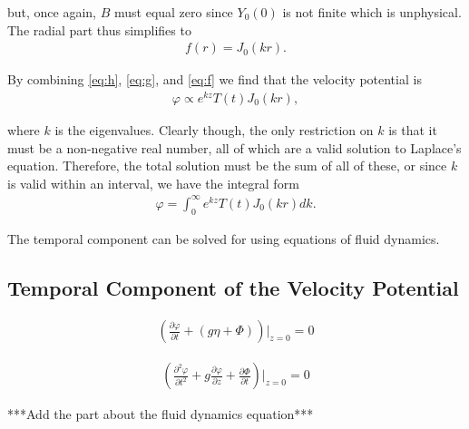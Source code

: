 \documentclass[12pt]{article}
\begin{document}
but, once again, $B$ must equal zero since $Y_0(0)$ is not finite which is unphysical. The radial part thus simplifies to
\begin{align}
\label{eq:f}
f(r) = J_0(kr).
\end{align}

By combining \eqref{eq:h}, \eqref{eq:g}, and \eqref{eq:f} we find that the velocity potential is 
\begin{align*}
\varphi \propto e^{kz}T(t)J_0(kr),
\end{align*}

where $k$ is the eigenvalues. Clearly though, the only restriction on $k$ is that it must be a non-negative real number, all of which are a valid solution to Laplace's equation. Therefore, the total solution must be the sum of all of these, or since $k$ is valid within an interval, we have the integral form 
\begin{align}
\label{eq:phieigen}
\varphi = \int_0^\infty e^{kz}T(t)J_0(kr)dk.
\end{align}

The temporal component can be solved for using equations of fluid dynamics.

\subsection{Temporal Component of the Velocity Potential}

\begin{align*}
\left( \frac{\partial \varphi}{\partial t} + (g \eta + \Phi) \right) \bigg|_{z=0} = 0
\end{align*}

\begin{align}
\label{eq:pressure}
\left( \frac{\partial^2 \varphi}{\partial t^2} + g \frac{\partial \varphi}{\partial z} + \frac{\partial \Phi}{\partial t} \right) \bigg|_{z=0} = 0
\end{align}

***Add the part about the fluid dynamics equation*** \\
\end{document}
